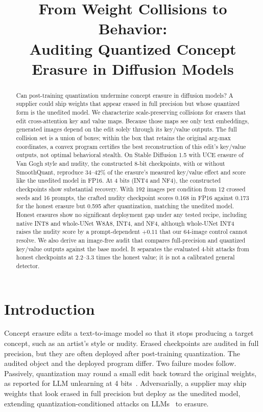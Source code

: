 \documentclass[conference]{IEEEtran}
\title{From Weight Collisions to Behavior:\\Auditing Quantized Concept Erasure in Diffusion Models}
\author{\IEEEauthorblockN{Anonymous Authors}}
\begin{document}
\maketitle

\begin{abstract}
Can post-training quantization undermine concept erasure in diffusion models?
A supplier could ship weights that appear erased in full precision but whose
quantized form is the unedited model. We characterize scale-preserving collisions
for erasers that edit cross-attention key and value maps. Because those maps see only
text embeddings, generated images depend on the edit solely through its key/value
outputs. The full collision set is a union of boxes; within the box that retains the
original arg-max coordinates, a convex program certifies the best reconstruction of
this edit's key/value outputs, not optimal behavioral stealth. On Stable Diffusion 1.5
with UCE erasure of Van Gogh style and nudity, the constructed 8-bit checkpoints,
with or without SmoothQuant, reproduce 34--42\% of the erasure's measured key/value
effect and score like the unedited model in FP16. At 4 bits (INT4 and NF4), the
constructed checkpoints show substantial recovery. With 192 images
per condition from 12 crossed seeds and 16 prompts, the crafted nudity checkpoint
scores 0.168 in FP16 against 0.173 for the honest erasure but 0.595 after
quantization, matching the unedited model. Honest erasures show no
significant deployment gap under any tested recipe, including native INT8 and
whole-UNet W8A8, INT4, and NF4, although whole-UNet INT4 raises the nudity score by a
prompt-dependent $+0.11$ that our 64-image control cannot resolve. We also derive an image-free audit that
compares full-precision and quantized key/value outputs against the base model. It
separates the evaluated 4-bit attacks from honest checkpoints at 2.2--3.3 times
the honest value; it is not a calibrated general detector.
\end{abstract}

\section{Introduction}
Concept erasure edits a text-to-image model so that it stops producing a target
concept, such as an artist's style or nudity. Erased checkpoints are audited in full
precision, but they are often deployed after post-training quantization. The audited
object and the deployed program differ. Two failure modes follow. Passively,
quantization may round a small edit back toward the original weights, as reported for
LLM unlearning at 4 bits~\cite{zhang2025}. Adversarially, a supplier may ship weights
that look erased in full precision but deploy as the unedited model, extending
quantization-conditioned attacks on LLMs~\cite{egashira2024,egashira2025} to erasure.
\end{document}
